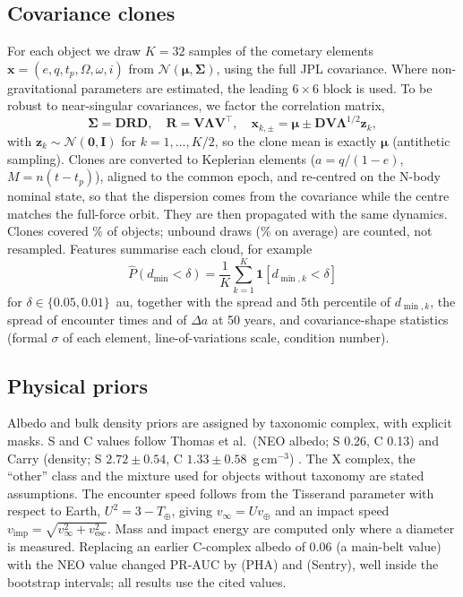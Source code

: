 \documentclass[journal]{IEEEtran}
\begin{document}
\subsection{Covariance clones}
For each object we draw $K=32$ samples of the cometary elements $\mathbf{x}=(e,q,t_p,\Omega,\omega,i)$ from $\mathcal{N}(\boldsymbol{\mu},\boldsymbol{\Sigma})$, using the full JPL covariance. Where non-gravitational parameters are estimated, the leading $6\times6$ block is used. To be robust to near-singular covariances, we factor the correlation matrix,
\begin{equation}
\boldsymbol{\Sigma} = \mathbf{D}\mathbf{R}\mathbf{D},\quad \mathbf{R}=\mathbf{V}\boldsymbol{\Lambda}\mathbf{V}^{\top},\quad
\mathbf{x}_{k,\pm} = \boldsymbol{\mu} \pm \mathbf{D}\mathbf{V}\boldsymbol{\Lambda}^{1/2}\mathbf{z}_k,
\end{equation}
with $\mathbf{z}_k\sim\mathcal{N}(\mathbf{0},\mathbf{I})$ for $k=1,\dots,K/2$, so the clone mean is exactly $\boldsymbol{\mu}$ (antithetic sampling). Clones are converted to Keplerian elements ($a=q/(1-e)$, $M=n(t-t_p)$), aligned to the common epoch, and re-centred on the N-body nominal state, so that the dispersion comes from the covariance while the centre matches the full-force orbit. They are then propagated with the same dynamics. Clones covered \UncCoverage\% of objects; unbound draws (\FracUnbound\% on average) are counted, not resampled. Features summarise each cloud, for example
\begin{equation}
\hat P(d_{\min}<\delta) = \frac{1}{K}\sum_{k=1}^{K} \mathbf{1}\!\left[d_{\min,k}<\delta\right]
\end{equation}
for $\delta\in\{0.05,0.01\}$~au, together with the spread and 5th percentile of $d_{\min,k}$, the spread of encounter times and of $\Delta a$ at 50 years, and covariance-shape statistics (formal $\sigma$ of each element, line-of-variations scale, condition number).

\subsection{Physical priors}
Albedo and bulk density priors are assigned by taxonomic complex, with explicit masks. S and C values follow Thomas et al.\ (NEO albedo; S 0.26, C 0.13) \cite{thomas2011} and Carry (density; S $2.72\pm0.54$, C $1.33\pm0.58$~g\,cm$^{-3}$) \cite{carry2012}. The X complex, the ``other'' class and the mixture used for objects without taxonomy are stated assumptions. The encounter speed follows from the Tisserand parameter with respect to Earth, $U^2 = 3 - T_\oplus$, giving $v_\infty = U v_\oplus$ and an impact speed $v_{\mathrm{imp}}=\sqrt{v_\infty^2+v_{\mathrm{esc}}^2}$. Mass and impact energy are computed only where a diameter is measured. Replacing an earlier C-complex albedo of 0.06 (a main-belt value) with the NEO value changed PR-AUC by \PriorDeltaPha{} (PHA) and \PriorDeltaSentry{} (Sentry), well inside the bootstrap intervals; all results use the cited values.
\end{document}
